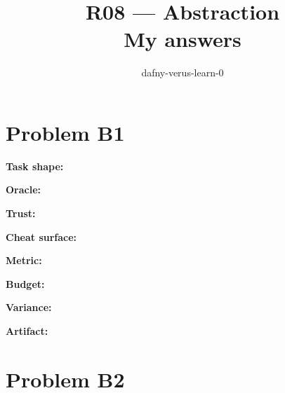 \documentclass[11pt]{article}
\title{R08 --- Abstraction \\ \large My answers}
\author{dafny-verus-learn-0}
\date{}
\begin{document}
\maketitle
\section*{Problem B1}\label{ans:B1}
\begin{answer}
\textbf{Task shape:} \vspace{1.5cm}

\textbf{Oracle:} \vspace{1.5cm}

\textbf{Trust:} \vspace{1.5cm}

\textbf{Cheat surface:} \vspace{1.5cm}

\textbf{Metric:} \vspace{1.5cm}

\textbf{Budget:} \vspace{1.5cm}

\textbf{Variance:} \vspace{1.5cm}

\textbf{Artifact:} \vspace{1.5cm}
\end{answer}
\section*{Problem B2}\label{ans:B2}
\begin{answer}
\vspace{8cm}
\end{answer}
\end{document}
